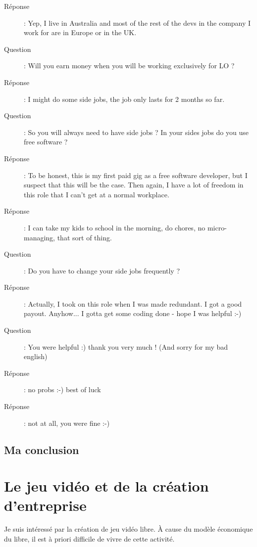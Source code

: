 \documentclass[a4paper,12pt, draft]{report}
\begin{document}
\begin{description}
\item [Réponse]:  Yep, I live in Australia and most of the rest of the devs in the company I work for are in Europe or in the UK.
\item [Question]:  Will you earn money when you will be working exclusively for LO ?
\item [Réponse]:  I might do some side jobs, the job only lasts for 2 months so far.
\item [Question]:  So you will always need to have side jobs ? In your sides jobs do you use free software ?
\item [Réponse]:  To be honest, this is my first paid gig as a free software developer, but I suspect that this will be the case. Then again, I have a lot of freedom in this role that I can't get at a normal workplace.
\item [Réponse]:  I can take my kids to school in the morning, do chores, no micro-managing, that sort of thing.
\item [Question]:  Do you have to change your side jobs frequently ?
\item [Réponse]:  Actually, I took on this role when I was made redundant. I got a good payout. Anyhow... I gotta get some coding done - hope I was helpful :-)
\item [Question]:  You were helpful :) thank you very much ! (And sorry for my bad english)
\item [Réponse]:  no probs :-) best of luck
\item [Réponse]:  not at all, you were fine :-)

\end{description}

\subsection{Ma conclusion}



\section{Le jeu vidéo et de la création d'entreprise}
Je suis intéressé par la création de jeu vidéo libre. À cause du modèle économique du libre, il est à priori difficile de vivre de cette activité.
\end{document}
